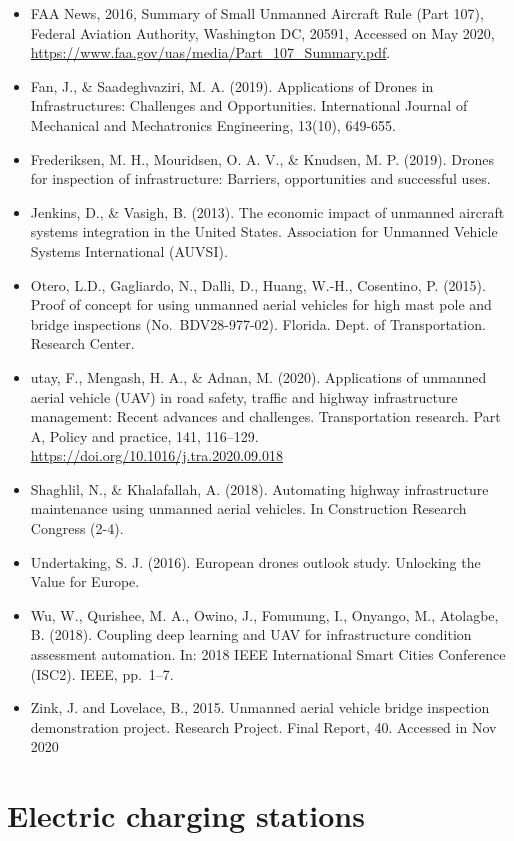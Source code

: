 \documentclass[
]{book}
\providecommand{\tightlist}{%
  \setlength{\itemsep}{0pt}\setlength{\parskip}{0pt}}
\begin{document}
\begin{itemize}
\tightlist
\item
  FAA News, 2016, Summary of Small Unmanned Aircraft Rule (Part 107), Federal Aviation Authority, Washington DC, 20591, Accessed on May 2020, \url{https://www.faa.gov/uas/media/Part_107_Summary.pdf}.
\item
  Fan, J., \& Saadeghvaziri, M. A. (2019). Applications of Drones in Infrastructures: Challenges and Opportunities. International Journal of Mechanical and Mechatronics Engineering, 13(10), 649-655.
\item
  Frederiksen, M. H., Mouridsen, O. A. V., \& Knudsen, M. P. (2019). Drones for inspection of infrastructure: Barriers, opportunities and successful uses.
\item
  Jenkins, D., \& Vasigh, B. (2013). The economic impact of unmanned aircraft systems integration in the United States. Association for Unmanned Vehicle Systems International (AUVSI).
\item
  Otero, L.D., Gagliardo, N., Dalli, D., Huang, W.-H., Cosentino, P. (2015). Proof of concept for using unmanned aerial vehicles for high mast pole and bridge inspections (No.~BDV28-977-02). Florida. Dept. of Transportation. Research Center.
\item
  utay, F., Mengash, H. A., \& Adnan, M. (2020). Applications of unmanned aerial vehicle (UAV) in road safety, traffic and highway infrastructure management: Recent advances and challenges. Transportation research. Part A, Policy and practice, 141, 116--129. \url{https://doi.org/10.1016/j.tra.2020.09.018}
\item
  Shaghlil, N., \& Khalafallah, A. (2018). Automating highway infrastructure maintenance using unmanned aerial vehicles. In Construction Research Congress (2-4).
\item
  Undertaking, S. J. (2016). European drones outlook study. Unlocking the Value for Europe.
\item
  Wu, W., Qurishee, M. A., Owino, J., Fomunung, I., Onyango, M., Atolagbe, B. (2018). Coupling deep learning and UAV for infrastructure condition assessment automation. In: 2018 IEEE International Smart Cities Conference (ISC2). IEEE, pp.~1--7.
\item
  Zink, J. and Lovelace, B., 2015. Unmanned aerial vehicle bridge inspection demonstration project. Research Project. Final Report, 40. Accessed in Nov 2020
\end{itemize}

\hypertarget{charging_station}{%
\section{Electric charging stations}\label{charging_station}}
\end{document}
